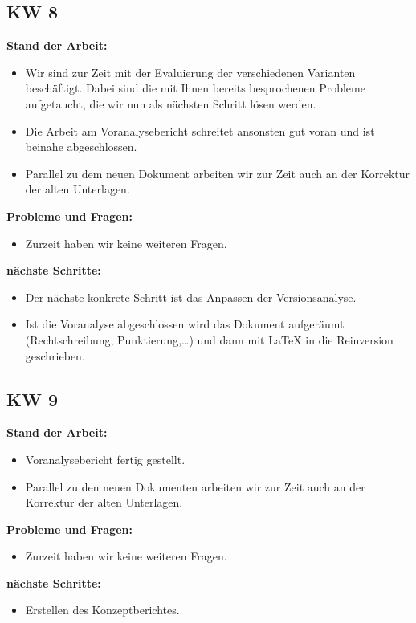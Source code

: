 \documentclass[10pt,paper=a4,final]{scrartcl}
\begin{document}
\subsection{KW 8}
\begin{description}
  \item {\bf Stand der Arbeit: } \\
    \begin{itemize}
      \item Wir sind zur Zeit mit der Evaluierung der verschiedenen Varianten beschäftigt. Dabei sind die mit Ihnen bereits besprochenen Probleme aufgetaucht, die wir nun als nächsten Schritt lösen werden.
      \item Die Arbeit am Voranalysebericht schreitet ansonsten gut voran und ist beinahe abgeschlossen.
      \item Parallel zu dem neuen Dokument arbeiten wir zur Zeit auch an der Korrektur der alten Unterlagen.
    \end{itemize}
  \item {\bf Probleme und Fragen: } \\
    \begin{itemize}
      \item Zurzeit haben wir keine weiteren Fragen.
    \end{itemize}
  \item {\bf nächste Schritte: } \\
    \begin{itemize}
      \item Der nächste konkrete Schritt ist das Anpassen der Versionsanalyse.
      \item Ist die Voranalyse abgeschlossen wird das Dokument aufgeräumt (Rechtschreibung, Punktierung,\ldots) und dann mit LaTeX in die Reinversion geschrieben.
    \end{itemize}
\end{description}
\subsection{KW 9}
\begin{description}
  \item {\bf Stand der Arbeit: } \\
    \begin{itemize}
      \item Voranalysebericht fertig gestellt.
      \item Parallel zu den neuen Dokumenten arbeiten wir zur Zeit auch an der Korrektur der alten Unterlagen.
    \end{itemize}
  \item {\bf Probleme und Fragen: } \\
    \begin{itemize}
      \item Zurzeit haben wir keine weiteren Fragen.
    \end{itemize}
  \item {\bf nächste Schritte: } \\
    \begin{itemize}
      \item Erstellen des Konzeptberichtes.
    \end{itemize}
\end{description}
\end{document}
